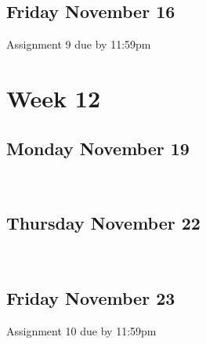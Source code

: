 \documentclass[]{book}
\let\originaltabular\tabular
\let\endoriginaltabular\endtabular
\renewenvironment{tabular}[1]{%
  \begingroup%
  \centering%
  \originaltabular{#1}}%
  {\endoriginaltabular\endgroup}
\theoremstyle{definition}
\theoremstyle{definition}
\theoremstyle{definition}
\theoremstyle{remark}
\begin{document}
\subsection{Friday November 16}\label{friday-november-16}

\begin{table}[H]
\centering
\begin{tabular}{l}
\hline
Assignment 9 due by 11:59pm\\
\hline
\end{tabular}
\end{table}

\section{Week 12}\label{week-12}

\subsection{Monday November 19}\label{monday-november-19}

\begin{table}[H]
\centering
\begin{tabular}{l}
\hline
\\
\hline
\end{tabular}
\end{table}

\subsection{Thursday November 22}\label{thursday-november-22}

\begin{table}[H]
\centering
\begin{tabular}{l}
\hline
\\
\hline
\end{tabular}
\end{table}

\subsection{Friday November 23}\label{friday-november-23}

\begin{table}[H]
\centering
\begin{tabular}{l}
\hline
Assignment 10 due by 11:59pm\\
\hline
\end{tabular}
\end{table}
\end{document}
